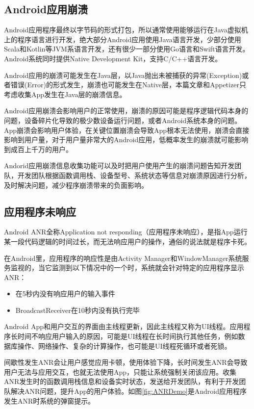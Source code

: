 \subsection{Android应用崩溃}

Android应用程序最终以字节码的形式打包，所以通常使用能够运行在Java虚拟机上的程序语言进行开发，绝大部分Android应用使用Java语言开发，少部分使用Scala和Kotlin等JVM系语言开发，还有很少一部分使用Go语言和Swift语言开发。Android系统同时提供Native Development Kit，支持C/C++语言开发。

Android应用的崩溃可能发生在Java层，以Java抛出未被捕获的异常(Exception)或者错误(Error)的形式发生，崩溃也可能发生在Native层，本篇文章和Appetizer只考虑收集App发生在Java层的崩溃信息。

Android应用崩溃会影响用户的正常使用，崩溃的原因可能是程序逻辑代码本身的问题，设备碎片化导致的极少数设备运行问题，或者Android系统本身的问题。App崩溃会影响用户体验，在关键位置崩溃会导致App根本无法使用，崩溃会直接影响到用户量，对于用户量非常大的Android应用，低概率发生的崩溃就可能影响到成百上千万的用户。

Andorid应用崩溃信息收集功能可以及时把用户使用产生的崩溃问题告知开发团队，开发团队根据函数调用栈、设备型号、系统状态等信息对崩溃原因进行分析，及时解决问题，减少程序崩溃带来的负面影响。

\subsection{应用程序未响应}
\label{subsec:background_ANR}

Android ANR全称Application not responding（应用程序未响应），是指App运行某一段代码逻辑的时间过长，而无法响应用户的操作，通俗的说法就是程序卡死。

在Android里，应用程序的响应性是由Activity Manager和WindowManager系统服务监视的，当它监测到以下情况中的一个时，系统就会针对特定的应用程序显示ANR：

 \begin{itemize}
 	\item 在5秒内没有响应用户的输入事件
 	\item BroadcastReceiver在10秒内没有执行完毕
 \end{itemize}

Android App和用户交互的界面由主线程更新，因此主线程又称为UI线程。应用程序长时间不响应用户输入的原因，可能是UI线程在长时间执行其他任务，例如数据库操作、网络操作、复杂的计算操作，也可能是UI线程死循环或者死锁。

间歇性发生ANR会让用户感觉应用卡顿，使用体验下降，长时间发生ANR会导致用户无法与应用交互，也就无法使用App，只能让系统强制关闭该应用。收集ANR发生时的函数调用栈信息和设备实时状态，发送给开发团队，有利于开发团队解决ANR问题，提升App的用户体验。如图\ref{fig:ANRDemo}是Android应用程序发生ANR时系统的弹窗提示。

